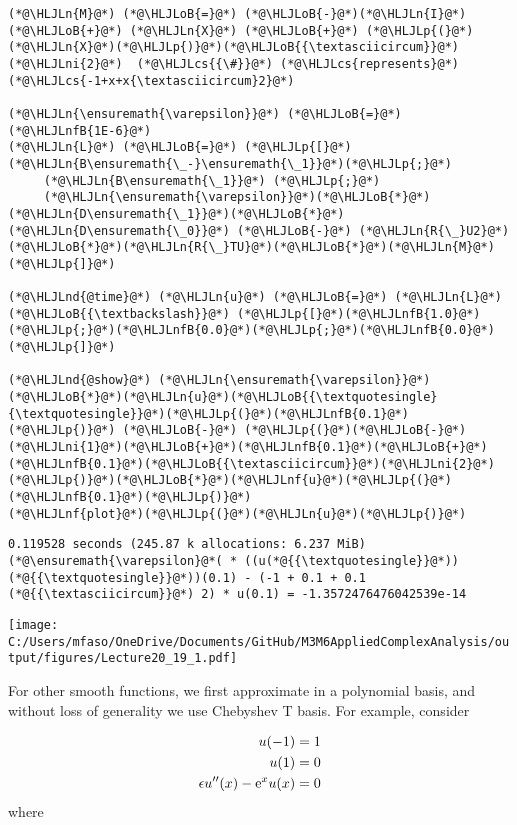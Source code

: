 \documentclass[12pt,a4paper]{article}
\newcommand{\HLJLn}[1]{#1}
\newcommand{\HLJLnd}[1]{\textcolor[RGB]{214,102,97}{#1}}
\newcommand{\HLJLnf}[1]{\textcolor[RGB]{66,102,213}{#1}}
\newcommand{\HLJLnfB}[1]{\textcolor[RGB]{59,151,46}{#1}}
\newcommand{\HLJLni}[1]{\textcolor[RGB]{59,151,46}{#1}}
\newcommand{\HLJLoB}[1]{\textcolor[RGB]{102,102,102}{\textbf{#1}}}
\newcommand{\HLJLp}[1]{#1}
\newcommand{\HLJLcs}[1]{\textcolor[RGB]{153,153,119}{\textit{#1}}}
\def\E{ {\rm e} }
\begin{document}
\begin{lstlisting}
(*@\HLJLn{M}@*) (*@\HLJLoB{=}@*) (*@\HLJLoB{-}@*)(*@\HLJLn{I}@*) (*@\HLJLoB{+}@*) (*@\HLJLn{X}@*) (*@\HLJLoB{+}@*) (*@\HLJLp{(}@*)(*@\HLJLn{X}@*)(*@\HLJLp{)}@*)(*@\HLJLoB{{\textasciicircum}}@*)(*@\HLJLni{2}@*)  (*@\HLJLcs{{\#}}@*) (*@\HLJLcs{represents}@*) (*@\HLJLcs{-1+x+x{\textasciicircum}2}@*)

(*@\HLJLn{\ensuremath{\varepsilon}}@*) (*@\HLJLoB{=}@*) (*@\HLJLnfB{1E-6}@*)
(*@\HLJLn{L}@*) (*@\HLJLoB{=}@*) (*@\HLJLp{[}@*)(*@\HLJLn{B\ensuremath{\_-}\ensuremath{\_1}}@*)(*@\HLJLp{;}@*)
     (*@\HLJLn{B\ensuremath{\_1}}@*) (*@\HLJLp{;}@*)
     (*@\HLJLn{\ensuremath{\varepsilon}}@*)(*@\HLJLoB{*}@*)(*@\HLJLn{D\ensuremath{\_1}}@*)(*@\HLJLoB{*}@*)(*@\HLJLn{D\ensuremath{\_0}}@*) (*@\HLJLoB{-}@*) (*@\HLJLn{R{\_}U2}@*)(*@\HLJLoB{*}@*)(*@\HLJLn{R{\_}TU}@*)(*@\HLJLoB{*}@*)(*@\HLJLn{M}@*)(*@\HLJLp{]}@*)

(*@\HLJLnd{@time}@*) (*@\HLJLn{u}@*) (*@\HLJLoB{=}@*) (*@\HLJLn{L}@*) (*@\HLJLoB{{\textbackslash}}@*) (*@\HLJLp{[}@*)(*@\HLJLnfB{1.0}@*)(*@\HLJLp{;}@*)(*@\HLJLnfB{0.0}@*)(*@\HLJLp{;}@*)(*@\HLJLnfB{0.0}@*)(*@\HLJLp{]}@*)

(*@\HLJLnd{@show}@*) (*@\HLJLn{\ensuremath{\varepsilon}}@*)(*@\HLJLoB{*}@*)(*@\HLJLn{u}@*)(*@\HLJLoB{{\textquotesingle}{\textquotesingle}}@*)(*@\HLJLp{(}@*)(*@\HLJLnfB{0.1}@*)(*@\HLJLp{)}@*) (*@\HLJLoB{-}@*) (*@\HLJLp{(}@*)(*@\HLJLoB{-}@*)(*@\HLJLni{1}@*)(*@\HLJLoB{+}@*)(*@\HLJLnfB{0.1}@*)(*@\HLJLoB{+}@*)(*@\HLJLnfB{0.1}@*)(*@\HLJLoB{{\textasciicircum}}@*)(*@\HLJLni{2}@*)(*@\HLJLp{)}@*)(*@\HLJLoB{*}@*)(*@\HLJLnf{u}@*)(*@\HLJLp{(}@*)(*@\HLJLnfB{0.1}@*)(*@\HLJLp{)}@*)
(*@\HLJLnf{plot}@*)(*@\HLJLp{(}@*)(*@\HLJLn{u}@*)(*@\HLJLp{)}@*)
\end{lstlisting}

\begin{lstlisting}
0.119528 seconds (245.87 k allocations: 6.237 MiB)
(*@\ensuremath{\varepsilon}@*( * ((u(*@{{\textquotesingle}}@*))(*@{{\textquotesingle}}@*))(0.1) - (-1 + 0.1 + 0.1 (*@{{\textasciicircum}}@*) 2) * u(0.1) = -1.3572476476042539e-14
\end{lstlisting}

\texttt{[image: C:/Users/mfaso/OneDrive/Documents/GitHub/M3M6AppliedComplexAnalysis/output/figures/Lecture20\_19\_1.pdf]}

For other smooth functions, we first approximate in a polynomial basis,  and without loss of generality we use Chebyshev T basis. For example, consider


\begin{align*}
u(-1) &= 1\\
u(1) &= 0\\
\epsilon u''(x) - \E^x u(x) &= 0
\end{align*}
where
\end{document}
